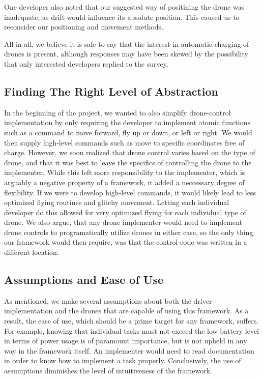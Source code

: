 One developer also noted that our suggested way of positining the drone was inadequate, as drift would influence its absolute position. This caused us to reconsider our positioning and movement methods.

All in all, we believe it is safe to say that the interest in automatic charging of drones is present, although  responses may have been skewed by the possibility that only interested developers replied to the survey.

\subsection{Finding The Right Level of Abstraction}
In the beginning of the project, we wanted to also simplify drone-control implementation by only requiring the developer to implement atomic functions such as a command to move forward, fly up or down, or left or right. We would then supply high-level commands such as move to specific coordinates free of charge. However, we soon realized that drone control varies based on the type of drone, and that it was best to leave the specifics of controlling the drone to the implementer. While this left more responsibility to the implementer, which is arguably a negative property of a framework, it added a neccessary degree of flexibility. If we were to develop high-level commands, it would likely lead to less optimized flying routines and glitchy movement. Letting each individual developer do this allowed for very optimized flying for each individual type of drone. We also argue, that any drone implementer would need to implement drone controls to programatically utilize drones in either case, so the only thing our framework would then require, was that the control-code was written in a different location.

\subsection{Assumptions and Ease of Use}
As mentioned, we make several assumptions about both the driver implementation and the drones that are capable of using this framework. As a result, the ease of use, which should be a prime target for any framework, suffers. For example, knowing that individual tasks must not exceed the low battery level in terms of power usage is of paramount importance, but is not upheld in any way in the framework itself. An implementer would need to read documentation in order to know how to implement a task properly. Conclusively, the use of assumptions diminishes the level of intuitiveness of the framework.

